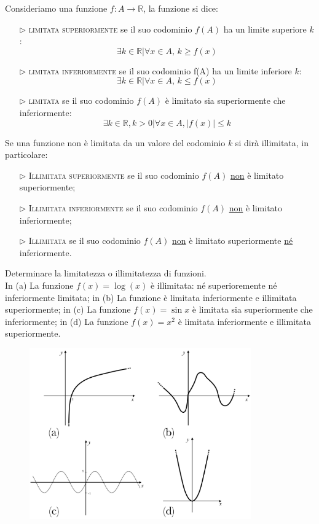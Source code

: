 \begin{definizione}
Consideriamo una funzione $f: A\to \mathbb{R}$, la funzione si dice:
  \begin{itemize}
  \item[$\rhd$]\textsc{limitata superiormente} se il suo 
codominio $f(A)$ ha un limite superiore $k$:
$$\exists k\in \mathbb{R} \vert \forall x\in A,\, k\geq f(x)$$ 
  \item[$\rhd$]\textsc{limitata inferiormente} se il suo 
codominio f(A) ha un limite inferiore $k$: 
$$\exists k\in \mathbb{R} \vert \forall x\in A,\, k\leq f(x)$$

  \item[$\rhd$]\textsc{limitata} se il suo codominio $f(A)$ è 
limitato sia superiormente che inferiormente:
$$\exists k\in \mathbb{R},k>0\vert\forall x\in A, \vert f(x)\vert \leq k$$
\end{itemize}

Se una funzione non è limitata da un valore del codominio $k$ si dirà 
illimitata, in particolare:
  \begin{itemize} 
  \item[$\rhd$] \textsc{Illimitata superiormente} se il suo 
codominio $f(A)$ \underline{non} è limitato superiormente;
  \item[$\rhd$] \textsc{Illimitata inferiormente} se il suo 
codominio $f(A)$ \underline{non} è limitato inferiormente;
  \item[$\rhd$] \textsc{Illimitata} se il suo codominio $f(A)$ 
\underline{non} è limitato superiormente \underline{né} inferiormente.
  \end{itemize}
\end{definizione}
%
\begin{esempio} Determinare la limitatezza o illimitatezza di funzioni.\\
In (a) La funzione $f(x)=\log(x)$ è illimitata: né superioremente né 
inferiormente limitata; in (b) La funzione è limitata inferiormente e 
illimitata superiormente; in (c) La funzione $f(x)=\sin{x}$ è limitata sia 
superiormente che inferiormente; in (d) La funzione $f(x)=x^2$ è limitata 
inferiormente e illimitata superiormente.
\begin{figure}[h]
  \centering
  \includegraphics[width=0.85\textwidth]{img/funz_12a.png}
\end{figure}
\end{esempio}
\newpage
